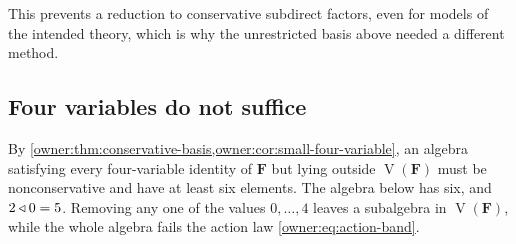 This prevents a reduction to conservative subdirect factors, even for models
of the intended theory, which is why the unrestricted basis above needed a
different method.

\subsection{Four variables do not suffice}

By \cref{owner:thm:conservative-basis,owner:cor:small-four-variable}, an
algebra satisfying every four-variable identity of $\mathbf F$ but lying
outside $\operatorname V(\mathbf F)$ must be nonconservative and have at
least six elements. The algebra below has six, and $2\mathbin{\triangleleft}0=5$.
Removing any one of the values $0,\dots,4$ leaves a subalgebra in
$\operatorname V(\mathbf F)$, while the whole algebra fails the action law
\eqref{owner:eq:action-band}.

